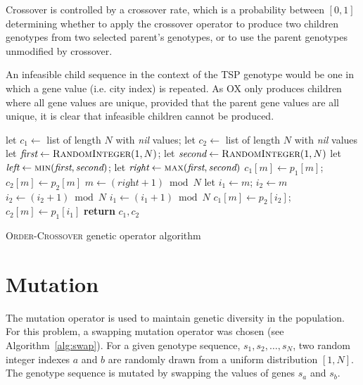 \documentclass[paper=a4, fontsize=10pt]{scrartcl}
\begin{document}
Crossover is controlled by a crossover rate, which is a probability between $[0, 1]$ determining whether to apply the crossover operator to produce two children genotypes from two selected parent's genotypes, or to use the parent genotypes unmodified by crossover.

An infeasible child sequence in the context of the \ac{TSP} genotype would be one in which a gene value (i.e. city index) is repeated. As \ac{OX} only produces children where all gene values are unique, provided that the parent gene values are all unique, it is clear that infeasible children cannot be produced.

\begin{algorithm}
\small
\begin{algorithmic}[1]
    \State let $c_1 \gets$ list of length $N$ with \textit{nil} values; let $c_2 \gets$ list of length $N$ with \textit{nil} values
    \State let $\textit{first} \gets \textsc{RandomInteger}(1, N)$; let $\textit{second} \gets \textsc{RandomInteger}(1, N)$
    \State let $\textit{left} \gets \textsc{min}(\textit{first}, \textit{second})$; let $\textit{right} \gets \textsc{max}(\textit{first}, \textit{second})$
        \State $c_1[m] \gets p_1[m]$; $c_2[m] \gets p_2[m]$
    \EndFor
    \State $m \gets (\textit{right} + 1) \bmod N$
    \State let $i_1 \gets m$; $i_2 \gets m$
            \State $i_2 \gets (i_2 + 1) \bmod N$
        \EndWhile
            \State $i_1 \gets (i_1 + 1) \bmod N$
        \EndWhile
        \State $c_1[m] \gets p_2[i_2]$; $c_2[m] \gets p_1[i_1]$
    \EndWhile
    \State \textbf{return} $c_1, c_2$
\EndFunction
\end{algorithmic}
\caption{\textsc{Order-Crossover} genetic operator algorithm}
\label{alg:ox}
\end{algorithm}

\section*{Mutation}

The mutation operator is used to maintain genetic diversity in the population. For this problem, a swapping mutation operator was chosen (see Algorithm~\ref{alg:swap}). For a given genotype sequence, $s_1, s_2, \dots, s_N$, two random integer indexes $a$ and $b$ are randomly drawn from a uniform distribution $[1, N]$. The genotype sequence is mutated by swapping the values of genes $s_a$ and $s_b$.
\end{document}
